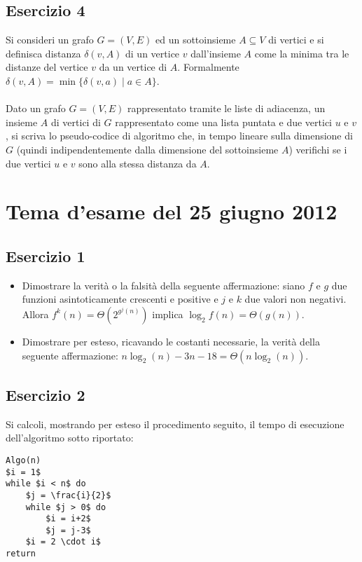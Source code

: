 \documentclass[11pt,a4paper,oneside]{article}
\begin{document}
\subsection*{Esercizio 4}Si consideri un grafo $G=(V,E)$ ed un sottoinsieme $A \subseteq V$ di vertici e si definisca distanza $\delta(v, A)$ di un vertice $v$ dall'insieme $A$ come la minima tra le distanze del vertice $v$ da un vertice di $A$. Formalmente $\delta(v, A) = \min\{\delta(v,a) \mid a \in A \}$.\\\\Dato un grafo $G=(V,E)$ rappresentato tramite le liste di adiacenza, un insieme $A$ di vertici di $G$ rappresentato come una lista puntata e due vertici $u$ e $v$, si scriva lo pseudo-codice di algoritmo che, in tempo lineare sulla dimensione di $G$ (quindi indipendentemente dalla dimensione del sottoinsieme $A$) verifichi se i due vertici $u$ e $v$ sono alla stessa distanza da $A$.
\pagebreak
%
%
\section*{Tema d'esame del 25 giugno 2012}
\subsection*{Esercizio 1} 
\begin{itemize}
	\item Dimostrare la verità o la falsità della seguente affermazione: siano $f$ e $g$ due funzioni asintoticamente crescenti e positive e $j$ e $k$ due valori non negativi. Allora $f^k(n) = \Theta(2^{g^j(n)})$ implica $\log_2f(n) = \Theta(g(n))$.
	\item Dimostrare per esteso, ricavando le costanti necessarie, la verità della seguente affermazione: $n\log_2(n)-3n-18 = \Theta(n\log_2(n))$.
\end{itemize}
\subsection*{Esercizio 2} Si calcoli, mostrando per esteso il procedimento seguito, il tempo di esecuzione dell'algoritmo sotto riportato:
\begin{lstlisting}[mathescape=true]
Algo(n)
$i = 1$
while $i < n$ do
	$j = \frac{i}{2}$
	while $j > 0$ do
		$i = i+2$
		$j = j-3$
	$i = 2 \cdot i$
return
\end{lstlisting}
\end{document}
